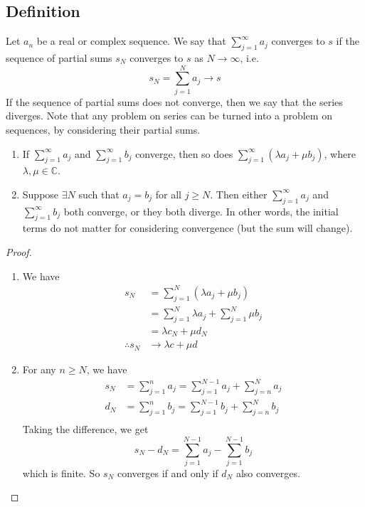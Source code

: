 \subsection{Definition}
Let \(a_n\) be a real or complex sequence.
We say that \(\sum_{j=1}^\infty a_j\) converges to \(s\) if the sequence of partial sums \(s_N\) converges to \(s\) as \(N \to \infty\), i.e.
\[
	s_N = \sum_{j=1}^N a_j \to s
\]
If the sequence of partial sums does not converge, then we say that the series diverges.
Note that any problem on series can be turned into a problem on sequences, by considering their partial sums.
\begin{lemma}
	\begin{enumerate}
		\item If \(\sum_{j=1}^\infty a_j\) and \(\sum_{j=1}^\infty b_j\) converge, then so does \(\sum_{j=1}^\infty (\lambda a_j + \mu b_j)\), where \(\lambda, \mu \in \mathbb C\).
		\item Suppose \(\exists N\) such that \(a_j = b_j\) for all \(j \geq N\).
		      Then either \(\sum_{j=1}^\infty a_j\) and \(\sum_{j=1}^\infty b_j\) both converge, or they both diverge.
		      In other words, the initial terms do not matter for considering convergence (but the sum will change).
	\end{enumerate}
\end{lemma}
\begin{proof}
	\begin{enumerate}
		\item We have
		      \begin{align*}
			      s_N            & = \sum_{j=1}^N (\lambda a_j + \mu b_j)            \\
			                     & = \sum_{j=1}^N \lambda a_j + \sum_{j=1}^N \mu b_j \\
			                     & = \lambda c_N + \mu d_N                           \\
			      \therefore s_N & \to \lambda c + \mu d
		      \end{align*}
		\item For any \(n \geq N\), we have
		      \begin{align*}
			      s_N & = \sum_{j=1}^n a_j = \sum_{j=1}^{N-1} a_j + \sum_{j=n}^N a_j \\
			      d_N & = \sum_{j=1}^n b_j = \sum_{j=1}^{N-1} b_j + \sum_{j=n}^N b_j \\
		      \end{align*}
		      Taking the difference, we get
		      \[
			      s_N - d_N = \sum_{j=1}^{N-1} a_j - \sum_{j=1}^{N-1} b_j
		      \]
		      which is finite.
		      So \(s_N\) converges if and only if \(d_N\) also converges.
	\end{enumerate}
\end{proof}

